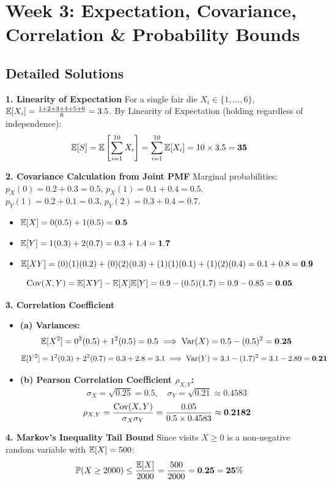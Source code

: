 \section*{Week 3: Expectation, Covariance, Correlation \& Probability Bounds}

\subsection*{Detailed Solutions}

\textbf{1. Linearity of Expectation}
For a single fair die $X_i \in \{1, \dots, 6\}$, $\mathbb{E}[X_i] = \frac{1+2+3+4+5+6}{6} = 3.5$.
By Linearity of Expectation (holding regardless of independence):
$$\mathbb{E}[S] = \mathbb{E}\left[ \sum_{i=1}^{10} X_i \right] = \sum_{i=1}^{10} \mathbb{E}[X_i] = 10 \times 3.5 = \mathbf{35}$$

\textbf{2. Covariance Calculation from Joint PMF}
Marginal probabilities: $p_X(0) = 0.2 + 0.3 = 0.5, \, p_X(1) = 0.1 + 0.4 = 0.5$.
$p_Y(1) = 0.2 + 0.1 = 0.3, \, p_Y(2) = 0.3 + 0.4 = 0.7$.
\begin{itemize}
    \item $\mathbb{E}[X] = 0(0.5) + 1(0.5) = \mathbf{0.5}$
    \item $\mathbb{E}[Y] = 1(0.3) + 2(0.7) = 0.3 + 1.4 = \mathbf{1.7}$
    \item $\mathbb{E}[XY] = (0)(1)(0.2) + (0)(2)(0.3) + (1)(1)(0.1) + (1)(2)(0.4) = 0.1 + 0.8 = \mathbf{0.9}$
\end{itemize}
$$\operatorname{Cov}(X, Y) = \mathbb{E}[XY] - \mathbb{E}[X]\mathbb{E}[Y] = 0.9 - (0.5)(1.7) = 0.9 - 0.85 = \mathbf{0.05}$$

\textbf{3. Correlation Coefficient}
\begin{itemize}
    \item \textbf{(a) Variances:}
    $$\mathbb{E}[X^2] = 0^2(0.5) + 1^2(0.5) = 0.5 \implies \operatorname{Var}(X) = 0.5 - (0.5)^2 = \mathbf{0.25}$$
    $$\mathbb{E}[Y^2] = 1^2(0.3) + 2^2(0.7) = 0.3 + 2.8 = 3.1 \implies \operatorname{Var}(Y) = 3.1 - (1.7)^2 = 3.1 - 2.89 = \mathbf{0.21}$$
    \item \textbf{(b) Pearson Correlation Coefficient $\rho_{X,Y}$:}
    $$\sigma_X = \sqrt{0.25} = 0.5, \quad \sigma_Y = \sqrt{0.21} \approx 0.4583$$
    $$\rho_{X,Y} = \frac{\operatorname{Cov}(X, Y)}{\sigma_X \sigma_Y} = \frac{0.05}{0.5 \times 0.4583} \approx \mathbf{0.2182}$$
\end{itemize}

\textbf{4. Markov's Inequality Tail Bound}
Since visits $X \ge 0$ is a non-negative random variable with $\mathbb{E}[X] = 500$:
$$\mathbb{P}(X \ge 2000) \le \frac{\mathbb{E}[X]}{2000} = \frac{500}{2000} = \mathbf{0.25 = 25\%}$$


